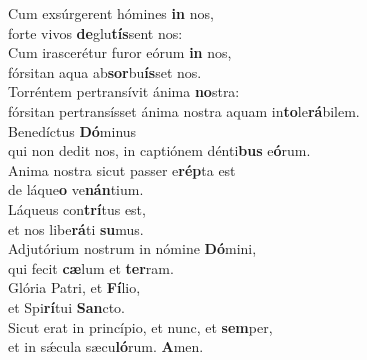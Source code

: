 \evenverse Cum exsúrgerent hómines \textbf{in} nos,~\*\\
\evenverse forte vivos \textbf{de}glu\textbf{tís}sent nos:\\
\oddverse Cum irascerétur furor eórum \textbf{in} nos,~\*\\
\oddverse fórsitan aqua ab\textbf{sor}bu\textbf{ís}set nos.\\
\evenverse Torréntem pertransívit ánima \textbf{no}stra:~\*\\
\evenverse fórsitan pertransísset ánima nostra aquam in\textbf{to}le\textbf{rá}bilem.\\
\oddverse Benedíctus \textbf{Dó}minus~\*\\
\oddverse qui non dedit nos, in captiónem dénti\textbf{bus} e\textbf{ó}rum.\\
\evenverse Anima nostra sicut passer e\textbf{rép}ta est~\*\\
\evenverse de láque\textbf{o} ve\textbf{nán}tium.\\
\oddverse Láqueus con\textbf{trí}tus est,~\*\\
\oddverse et nos libe\textbf{rá}ti \textbf{su}mus.\\
\evenverse Adjutórium nostrum in nómine \textbf{Dó}mini,~\*\\
\evenverse qui fecit \textbf{cæ}lum et \textbf{ter}ram.\\
\oddverse Glória Patri, et \textbf{Fí}lio,~\*\\
\oddverse et Spi\textbf{rí}tui \textbf{San}cto.\\
\evenverse Sicut erat in princípio, et nunc, et \textbf{sem}per,~\*\\
\evenverse et in sǽcula sæcu\textbf{ló}rum. \textbf{A}men.\\
